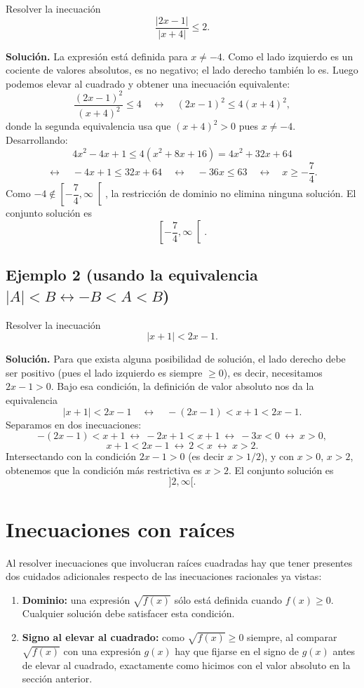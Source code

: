 \documentclass[11pt]{article}
\begin{document}
Resolver la inecuación
\[
\frac{|2x-1|}{|x+4|} \le 2.
\]

\textbf{Solución.} La expresión está definida para $x \neq -4$. Como el lado izquierdo es un
cociente de valores absolutos, es no negativo; el lado derecho también lo es. Luego podemos elevar
al cuadrado y obtener una inecuación equivalente:
\[
\frac{(2x-1)^2}{(x+4)^2} \le 4 \quad \leftrightarrow \quad (2x-1)^2 \le 4(x+4)^2,
\]
donde la segunda equivalencia usa que $(x+4)^2 > 0$ pues $x \neq -4$. Desarrollando:
\[
4x^2 - 4x + 1 \le 4(x^2 + 8x + 16) = 4x^2 + 32x + 64
\]
\[
\leftrightarrow \quad -4x + 1 \le 32x + 64 \quad \leftrightarrow \quad -36x \le 63 \quad
\leftrightarrow \quad x \ge -\frac{7}{4}.
\]
Como $-4 \notin \left[-\dfrac{7}{4}, \infty\right[$, la restricción de dominio no elimina ninguna
solución. El conjunto solución es
\[
\left[-\frac{7}{4}, \infty\right[.
\]

\subsection*{Ejemplo 2 (usando la equivalencia $|A|<B \leftrightarrow -B<A<B$)}

Resolver la inecuación
\[
|x+1| < 2x - 1.
\]

\textbf{Solución.} Para que exista alguna posibilidad de solución, el lado derecho debe ser
positivo (pues el lado izquierdo es siempre $\ge 0$), es decir, necesitamos $2x - 1 > 0$. Bajo esa
condición, la definición de valor absoluto nos da la equivalencia
\[
|x+1| < 2x-1 \quad \leftrightarrow \quad -(2x-1) < x+1 < 2x-1.
\]
Separamos en dos inecuaciones:
\[
-(2x-1) < x+1 \ \leftrightarrow\ -2x+1 < x+1 \ \leftrightarrow\ -3x < 0 \ \leftrightarrow\ x > 0,
\]
\[
x+1 < 2x - 1 \ \leftrightarrow\ 2 < x \ \leftrightarrow\ x > 2.
\]
Intersectando con la condición $2x-1>0$ (es decir $x > 1/2$), y con $x>0$, $x>2$, obtenemos que la
condición más restrictiva es $x>2$. El conjunto solución es
\[
]2,\infty[.
\]

\section{Inecuaciones con raíces}

Al resolver inecuaciones que involucran raíces cuadradas hay que tener presentes dos cuidados
adicionales respecto de las inecuaciones racionales ya vistas:

\begin{enumerate}[label=(\alph*)]
    \item \textbf{Dominio:} una expresión $\sqrt{f(x)}$ sólo está definida cuando $f(x) \ge 0$.
    Cualquier solución debe satisfacer esta condición.
    \item \textbf{Signo al elevar al cuadrado:} como $\sqrt{f(x)} \ge 0$ siempre, al comparar
    $\sqrt{f(x)}$ con una expresión $g(x)$ hay que fijarse en el signo de $g(x)$ antes de elevar al
    cuadrado, exactamente como hicimos con el valor absoluto en la sección anterior.
\end{enumerate}
\end{document}
